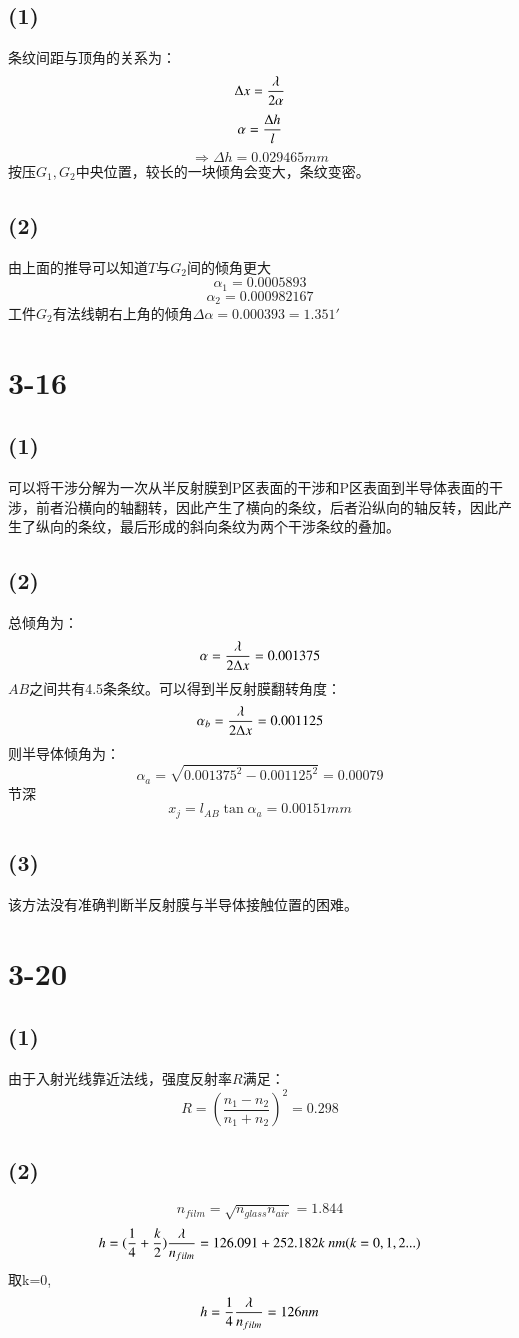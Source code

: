 \documentclass[UTF8,9pt]{ctexart}
\begin{document}
\subsection{(1)}
条纹间距与顶角的关系为：
$$\Delta x=\frac{\lambda}{2\alpha}$$
$$\alpha=\frac{\Delta h}{l}$$
$$\Rightarrow \Delta h=0.029465mm$$
按压$G_1, G_2$中央位置，较长的一块倾角会变大，条纹变密。
\subsection{(2)}
由上面的推导可以知道$T$与$G_2$间的倾角更大
$$\alpha_1=0.0005893$$
$$\alpha_2=0.000982167$$
工件$G_2$有法线朝右上角的倾角$\Delta \alpha=0.000393=1.351'$
\section{3-16}
\subsection{(1)}
可以将干涉分解为一次从半反射膜到P区表面的干涉和P区表面到半导体表面的干涉，前者沿横向的轴翻转，因此产生了横向的条纹，后者沿纵向的轴反转，因此产生了纵向的条纹，最后形成的斜向条纹为两个干涉条纹的叠加。
\subsection{(2)}
总倾角为：
$$\alpha=\frac{\lambda}{2\Delta x}=0.001375$$
$AB$之间共有4.5条条纹。可以得到半反射膜翻转角度：
$$\alpha_b=\frac{\lambda}{2\Delta x}=0.001125$$
则半导体倾角为：
$$\alpha_a=\sqrt{0.001375^2-0.001125^2}=0.00079$$
节深$$x_j=l_{AB}\tan\alpha_a=0.00151mm$$
\subsection{(3)}
该方法没有准确判断半反射膜与半导体接触位置的困难。
\section{3-20}
\subsection{(1)}
由于入射光线靠近法线，强度反射率$R$满足：
$$R = \left( \frac { n _ { 1 } - n _ { 2 } } { n _ { 1 } + n _ { 2 } } \right) ^ { 2 }=0.298$$
\subsection{(2)}
$$n_{film}=\sqrt{n_{glass}n_{air}}=1.844$$
$$h=(\frac{1}{4}+\frac{k}{2})\frac{\lambda}{n_{film}}=126.091 + 252.182 k\ nm(k=0,1,2...)$$
取k=0,
$$h=\frac{1}{4}\frac{\lambda}{n_{film}}=126 nm$$
\end{document}
